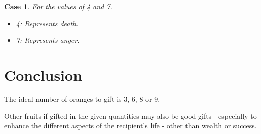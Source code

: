 \documentclass[10pt,a4paper]{article}
\newtheorem{case}[theorem]{Case}
\begin{document}
\begin{case}
    For the values of 4 and 7.

    \begin{itemize}
        \item 4: Represents death.
        \item 7: Represents anger.
    \end{itemize}
\end{case}

\section{Conclusion}
The ideal number of oranges to gift is 3, 6, 8 or 9.

Other fruits if gifted in the given quantities may also be good gifts - especially to enhance the different aspects of the recipient's life - other than wealth or success.
\end{document}
